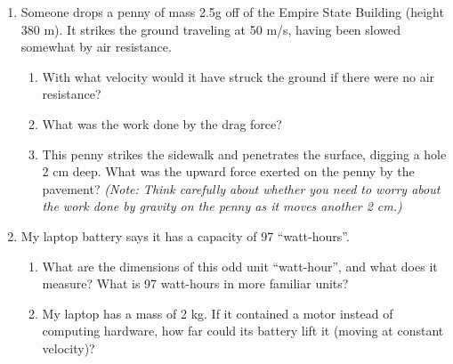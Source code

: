 \documentclass[12pt]{article}
\begin{document}
\Large
\centerline{}

\normalsize
\centerline{}

\bigskip
\bigskip
\begin{enumerate}

	\item{Someone drops a penny of mass 2.5g off of the Empire State Building (height 380 m). It strikes the ground traveling at 50 m/s, having been slowed somewhat by air resistance.}
\begin{enumerate}
	\item{With what velocity would it have struck the ground if there were no air resistance?}
	
	\vspace{1.5in}
	
	\item{What was the work done by the drag force?}
	
	\vspace{1in}
	
	\item{This penny strikes the sidewalk and penetrates the surface, digging a hole 2 cm deep. What was the upward force exerted on the penny by the pavement? {\it (Note: Think carefully about whether you need to worry about the work done by gravity on the penny as it moves another 2 cm.)}}
	
	\vspace{1.2in}
	
\end{enumerate}

\item{My laptop battery says it has a capacity of 97 ``watt-hours''.}
\begin{enumerate}
	\item{What are the dimensions of this odd unit ``watt-hour'', and what does it measure? What is 97 watt-hours in more familiar units?}
	
	\vspace{1in}
	
	\item{My laptop has a mass of 2 kg. If it contained a motor instead of computing hardware, how far could its battery lift it (moving at constant velocity)?}
	
	\vspace{1.5in}
\end{enumerate}
%
%	
%	
%	


\end{enumerate}
\end{document}
